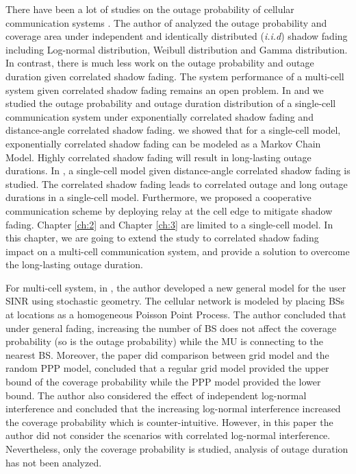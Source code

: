  \par There have been a lot of studies on the outage probability of cellular communication systems \cite{abu1991outage, petrovic2013outage, emamian2014outage}. The author of \cite{vural2015effect} analyzed the outage probability and coverage area under independent and identically distributed (\emph{i.i.d}) shadow fading including Log-normal distribution, Weibull distribution and Gamma distribution. In contrast, there is much less work on the outage probability and outage duration given correlated shadow fading. The system performance of a multi-cell system given correlated shadow fading remains an open problem. In \cite{lu2015long} and \cite{lu2015shining} we studied the outage probability and outage duration distribution of a single-cell communication system under exponentially correlated shadow fading and distance-angle correlated shadow fading. \cite{lu2015long} we showed that for a single-cell model, exponentially correlated shadow fading can be modeled as a Markov Chain Model. Highly correlated shadow fading will result in long-lasting outage durations. In \cite{lu2015shining}, a single-cell model given distance-angle correlated shadow fading is studied. The correlated shadow fading leads to correlated outage and long outage durations in a single-cell model. Furthermore, we proposed a cooperative communication scheme by deploying relay at the cell edge to mitigate shadow fading. Chapter \ref{ch:2} and Chapter \ref{ch:3} are limited to a single-cell model. In this chapter, we are going to extend the study to correlated shadow fading impact on a multi-cell communication system, and provide a solution to overcome the long-lasting outage duration.
 \par For multi-cell system, in \cite{andrews2011tractable}, the author developed a new general model for the user SINR using stochastic geometry. The cellular network is modeled by placing BSs at locations as a homogeneous Poisson Point Process. The author concluded that under general fading, increasing the number of BS does not affect the coverage probability (so is the outage probability) while the MU is connecting to the nearest BS. Moreover, the paper did comparison between grid model and the random PPP model, concluded that a regular grid model provided the upper bound of the coverage probability while the PPP model provided the lower bound. The author also considered the effect of independent log-normal interference and concluded that the increasing log-normal interference increased the coverage probability which is counter-intuitive. However, in this paper the author did not consider the scenarios with correlated log-normal interference. Nevertheless, only the coverage probability is studied, analysis of outage duration has not been analyzed. 
